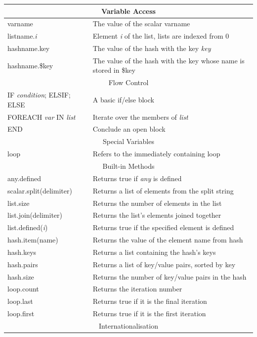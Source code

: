 \begin{tabular}{|l|p{7cm}|}
	\hline
	\multicolumn{2}{|c|}{Variable Access}\\
	\hline
	varname & The value of the scalar varname\\
	listname.\emph{i} & Element \emph{i} of the list, lists are indexed from 0\\
	hashname.key & The value of the hash with the key \emph{key}\\
	hashname.\$key & The value of the hash with the key whose name is stored in \$key\\
	\hline
	\multicolumn{2}{|c|}{Flow Control}\\
	\hline
	IF \emph{condition}; ELSIF; ELSE & A basic if/else block \\ 
	FOREACH \emph{var} IN \emph{list} & Iterate over the members of \emph{list}\\
	END & Conclude an open block \\
	\hline
	\multicolumn{2}{|c|}{Special Variables}\\
	\hline
	loop & Refers to the immediately containing loop\\
	\hline
	\multicolumn{2}{|c|}{Built-in Methods}\\
	\hline
	any.defined & Returns true if \emph{any} is defined\\
	scalar.split(delimiter) & Returns a list of elements from the split string\\
	list.size & Returns the number of elements in the list\\
	list.join(delimiter) & Returns the list's elements joined together\\
	list.defined(\emph{i}) & Returns true if the specified element is defined\\
	hash.item(name) & Returns the value of the element name from hash\\
	hash.keys & Returns a list containing the hash's keys\\
	hash.pairs & Returns a list of key/value pairs, sorted by key\\
	hash.size & Returns the number of key/value pairs in the hash\\
	loop.count & Returns the iteration number\\
	loop.last & Returns true if it is the final iteration\\
	loop.first & Returns true if it is the first iteration\\
	\hline
	\multicolumn{2}{|c|}{Internationalisation}\\

\end{tabular}
